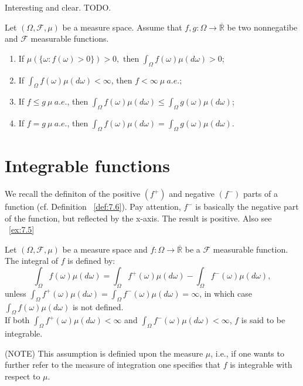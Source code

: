 \begin{example}[$\mu (a.e.)$]
    \label{ex:8.3}
    Interesting and clear. TODO.
\end{example}

\begin{proposition}[]
    \label{prop:8.5}
    Let $(\Omega, \mathcal{F}, \mu)$ be a measure space. Assume that $f, g: \Omega
    \to \overline{\mathbb{R}}$ be two nonnegatibe and $\mathcal{F}$ measurable functions.
    \begin{enumerate}[label=(\roman*)]
        \item If $\mu(\{\omega: f(\omega) > 0\} ) > 0, \text{ then } \int_{\Omega} f(\omega)
            \mu(d\omega)>0$;
        \item If $\int_{\Omega} f(\omega)\mu(d\omega) < \infty$, then $f<\infty \ \mu \ a.e.;$
        \item If  $f\le g \ \mu \ a.e.$, then $\int_{\Omega} f(\omega)\mu(d\omega)\le 
            \int_{\Omega} g(\omega)\mu(d\omega)$;
        \item If  $f = g \ \mu \ a.e.$, then $\int_{\Omega} f(\omega)\mu(d\omega) =
            \int_{\Omega} g(\omega)\mu(d\omega)$.
    \end{enumerate}
\end{proposition}

\section{Integrable functions}%
\label{sec:Integrable functions}
We recall the definiton of the positive $\left( f^{+} \right) $ and negative $\left( f^{-} \right) $
parts of a function (cf. Definition ~\ref{def:7.6}). Pay attention, $f^{-}$ is basically the negative
part of the function, but reflected by the x-axis. The result is positive. Also see ~\ref{ex:7.5}

\begin{definition}
    \label{def:8.5}
    Let $(\Omega, \mathcal{F}, \mu)$ be a measure space  and $f: \Omega\to \overline{\mathbb{R}}$
    be a $\mathcal{F}$ measurable function. The integral of $f$ is defined by:
    \[
    \int_{\Omega} f(\omega)\mu(d\omega) = \int_{\Omega} f^{+}(\omega)\mu(d\omega) -
    \int_{\Omega} f^{-}(\omega)\mu(d\omega)
    ,\] 
    unless $\int_{\Omega} f^{+}(\omega)\mu(d\omega) = \int_{\Omega} f^{-}(\omega)\mu(d\omega) = 
    \infty$,
    in which case $\int_{\Omega} f(\omega)\mu(d\omega)$ is not defined. \\ If both 
    $\int_{\Omega} f^{+}(\omega)\mu(d\omega) 
    < \infty$ and $\int_{\Omega}f^{-}(\omega)\mu(d\omega) 
    < \infty$,
    $f$ is said to be integrable.

    (NOTE) This assumption is definied upon the measure $\mu$, i.e., if one wants to further refer to the measure
    of integration one specifies that $f$ is integrable with respect to $\mu$.
\end{definition}

